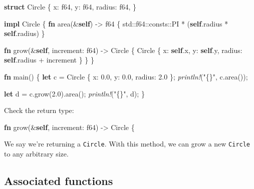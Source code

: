 \documentclass[a4paper,]{book}
\newenvironment{Shaded}{\begin{snugshade}}{\end{snugshade}}
\newcommand{\KeywordTok}[1]{\textcolor[rgb]{0.13,0.29,0.53}{\textbf{{#1}}}}
\newcommand{\DataTypeTok}[1]{\textcolor[rgb]{0.13,0.29,0.53}{{#1}}}
\newcommand{\DecValTok}[1]{\textcolor[rgb]{0.00,0.00,0.81}{{#1}}}
\newcommand{\StringTok}[1]{\textcolor[rgb]{0.31,0.60,0.02}{{#1}}}
\newcommand{\PreprocessorTok}[1]{\textcolor[rgb]{0.56,0.35,0.01}{\textit{{#1}}}}
\newcommand{\NormalTok}[1]{{#1}}
\begin{document}
\begin{Shaded}
\begin{Highlighting}[]
\KeywordTok{struct} \NormalTok{Circle \{}
    \NormalTok{x: }\DataTypeTok{f64}\NormalTok{,}
    \NormalTok{y: }\DataTypeTok{f64}\NormalTok{,}
    \NormalTok{radius: }\DataTypeTok{f64}\NormalTok{,}
\NormalTok{\}}

\KeywordTok{impl} \NormalTok{Circle \{}
    \KeywordTok{fn} \NormalTok{area(&}\KeywordTok{self}\NormalTok{) -> }\DataTypeTok{f64} \NormalTok{\{}
        \NormalTok{std::}\DataTypeTok{f64}\NormalTok{::consts::PI * (}\KeywordTok{self}\NormalTok{.radius * }\KeywordTok{self}\NormalTok{.radius)}
    \NormalTok{\}}

    \KeywordTok{fn} \NormalTok{grow(&}\KeywordTok{self}\NormalTok{, increment: }\DataTypeTok{f64}\NormalTok{) -> Circle \{}
        \NormalTok{Circle \{ x: }\KeywordTok{self}\NormalTok{.x, y: }\KeywordTok{self}\NormalTok{.y, radius: }\KeywordTok{self}\NormalTok{.radius + increment \}}
    \NormalTok{\}}
\NormalTok{\}}

\KeywordTok{fn} \NormalTok{main() \{}
    \KeywordTok{let} \NormalTok{c = Circle \{ x: }\DecValTok{0.0}\NormalTok{, y: }\DecValTok{0.0}\NormalTok{, radius: }\DecValTok{2.0} \NormalTok{\};}
    \PreprocessorTok{println!}\NormalTok{(}\StringTok{"\{\}"}\NormalTok{, c.area());}

    \KeywordTok{let} \NormalTok{d = c.grow(}\DecValTok{2.0}\NormalTok{).area();}
    \PreprocessorTok{println!}\NormalTok{(}\StringTok{"\{\}"}\NormalTok{, d);}
\NormalTok{\}}
\end{Highlighting}
\end{Shaded}

Check the return type:

\begin{Shaded}
\begin{Highlighting}[]
\KeywordTok{fn} \NormalTok{grow(&}\KeywordTok{self}\NormalTok{, increment: }\DataTypeTok{f64}\NormalTok{) -> Circle \{}
\end{Highlighting}
\end{Shaded}

We say we're returning a \texttt{Circle}. With this method, we can grow
a new \texttt{Circle} to any arbitrary size.

\subsection{Associated functions}\label{associated-functions}
\end{document}
